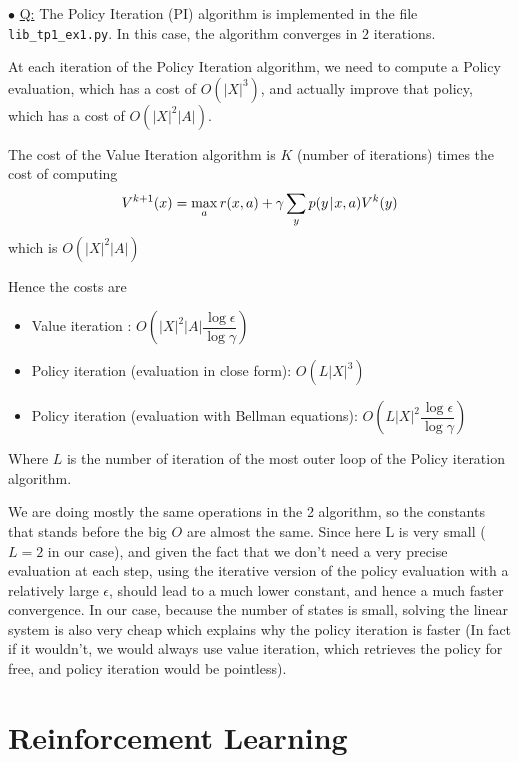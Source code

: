 \documentclass[a4paper, 11pt]{article}
\newcounter{cquestion}
\renewcommand{\thecquestion}{\arabic{cquestion}}
\newenvironment{question}
{\par \vspace{0.5em} \noindent \stepcounter{cquestion} \hspace{-1em}
 $\bullet$ \underline{Q\thecquestion :}}
{}
\newcommand{\file}[1]{\lstinline{#1}}
\newcommand{\pcond}[2]{p(#1 \hspace{-.2em}\mid\hspace{-.2em} #2)}
\begin{document}
\begin{question}
  The Policy Iteration (PI) algorithm is implemented in the file
  \file{lib_tp1_ex1.py}. In this case, the algorithm converges in
  $2$ iterations.

  At each iteration of the Policy Iteration algorithm, we need to
  compute a Policy evaluation, which has a cost of $O(|X|^3)$, and
  actually improve that policy, which has a cost of $O(|X|^2 |A|)$.

  The cost of the Value Iteration algorithm is $K$ (number of
  iterations) times the cost of computing
  \begin{equation*}
    V^{k+1}(x) = \max_a{r(x, a) + \gamma \sum_y { \pcond{y}{x, a} } V^{k}(y)}
  \end{equation*}
  which is $O(|X|^2 |A|)$

  Hence the costs are
  \begin{itemize}
  \item Value iteration : $O(|X|^2 |A| \dfrac{\log{\epsilon}}{\log{\gamma}})$
  \item Policy iteration (evaluation in close form): $O(L |X|^3)$
  \item Policy iteration (evaluation with Bellman equations): $O(L |X|^2 \dfrac{\log{\epsilon}}{\log{\gamma}})$
  \end{itemize}
  Where $L$ is the number of iteration of the most outer loop of the
  Policy iteration algorithm.

  We are doing mostly the same operations in the 2 algorithm, so the
  constants that stands before the big $O$ are almost the same.  Since
  here L is very small ($L=2$ in our case), and given the fact that we
  don't need a very precise evaluation at each step, using the
  iterative version of the policy evaluation with a relatively large
  $\epsilon$, should lead to a much lower constant, and hence a much
  faster convergence. In our case, because the number of states is
  small, solving the linear system is also very cheap which explains
  why the policy iteration is faster (In fact if it wouldn't, we would
  always use value iteration, which retrieves the policy for free, and
  policy iteration would be pointless).

\end{question}

\section{Reinforcement Learning}
\end{document}
